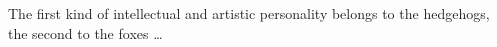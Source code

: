 \documentclass[a4paper,twoside]{ociamthesis}
\newcommand*{\bibtitle}{References}
\theoremstyle{definition}
\begin{document}
\flushbottom
%
%




\startappendices




\begin{savequote}[8cm]
The first kind of intellectual and artistic personality belongs to the hedgehogs, the second to the foxes \dots
\end{savequote}

\setlength{\baselineskip}{0pt} %

{\renewcommand*\MakeUppercase[1]{#1}%
\printbibliography[heading=bibintoc,title={\bibtitle}]}
\end{document}
